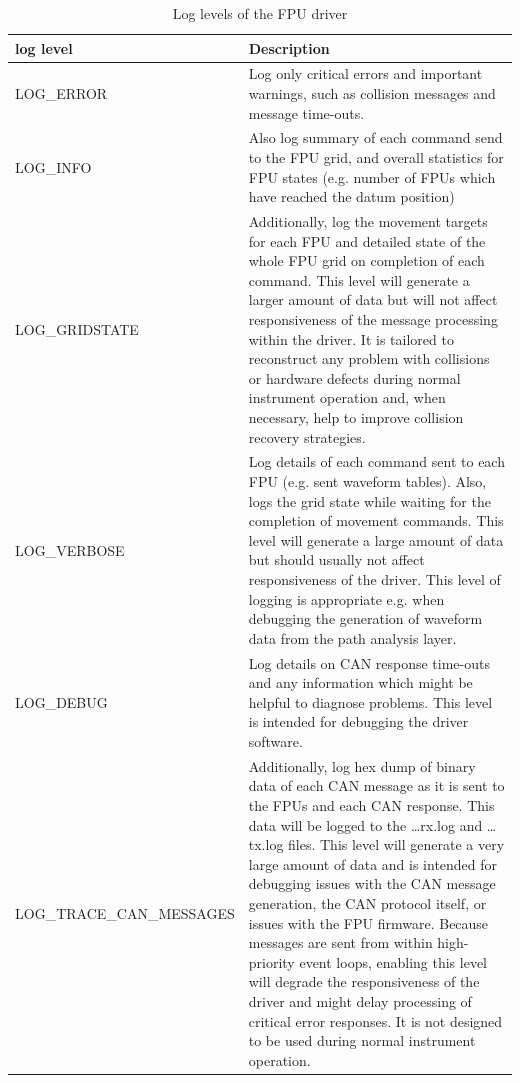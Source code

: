 \documentclass[11pt,a4paper]{report}
\begin{document}
\begin{table}
  \begin{centering}
\begin{tabular}{|l|p{}|}
  \hline
  \textbf{log level} & \textbf{Description} \\
  \hline
    LOG\_ERROR & 
    Log only critical errors and important warnings, such as collision
    messages and message time-outs. \\

    \hline
    LOG\_INFO & 
    Also log summary of each command send to the FPU grid, and
    overall statistics for FPU states (e.g. number of FPUs which
    have reached the datum position) \\

    \hline
    LOG\_GRIDSTATE &
    Additionally, log the movement targets for each
    FPU and detailed state of the whole FPU grid on completion of each
    command.  This level will generate a larger amount of data but
    will not affect responsiveness of the message processing within
    the driver.  It is tailored to reconstruct any problem with
    collisions or hardware defects during normal instrument operation
    and, when necessary, help to improve collision recovery
    strategies. \\

    \hline
    LOG\_VERBOSE &

    Log details of each command sent to each FPU
    (e.g. sent waveform tables). Also, logs the grid state while
    waiting for the completion of movement commands. This level will
    generate a large amount of data but should usually not affect
    responsiveness of the driver. This level of logging is appropriate
    e.g. when debugging the generation of waveform data from the path
    analysis layer. \\

    \hline
    LOG\_DEBUG &
    Log details on CAN response time-outs and any information which
    might be helpful to diagnose problems. This level is intended
    for debugging the driver software.\\

    \hline LOG\_TRACE\_CAN\_MESSAGES & Additionally, log hex dump of
    binary data of each CAN message as it is sent to the FPUs and each
    CAN response. This data will be logged to the \ldots{}rx.log and
    \ldots{}tx.log files. This level will generate a very large amount
    of data and is intended for debugging issues with the CAN message
    generation, the CAN protocol itself, or issues with the FPU
    firmware. Because messages are sent from within high-priority
    event loops, enabling this level will degrade the responsiveness
    of the driver and might delay processing of critical error
    responses. It is not designed to be used during normal instrument
    operation. \\
 
  
  \hline
\end{tabular}
\end{centering}
\caption{Log levels of the FPU driver}
\label{tab:loglevels}
\end{table}
\end{document}
